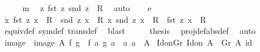 \begin{isabellebody}
\ {\isacharminus}{\kern0pt}\isanewline
\ \ \isamarkupfalse%
\ m\ \isamarkupfalse%
\ z{\isacharcolon}{\kern0pt}\ {\isachardoublequoteopen}{\isacharparenleft}{\kern0pt}fst\ z{\isacharcomma}{\kern0pt}\ snd\ z{\isacharparenright}{\kern0pt}\ {\isasymin}\ R{\isachardoublequoteclose}\ \isamarkupfalse%
\ auto\isanewline
\ \ \isamarkupfalse%
\ e\ \isamarkupfalse%
\ {\isachardoublequoteopen}{\isasymAnd}x{\isachardot}{\kern0pt}\ {\isacharparenleft}{\kern0pt}fst\ z{\isacharcomma}{\kern0pt}\ x{\isacharparenright}{\kern0pt}\ {\isasymin}\ R\ {\isasymLongrightarrow}\ {\isacharparenleft}{\kern0pt}snd\ z{\isacharcomma}{\kern0pt}\ x{\isacharparenright}{\kern0pt}\ {\isasymin}\ R{\isachardoublequoteclose}\ {\isachardoublequoteopen}{\isasymAnd}x{\isachardot}{\kern0pt}\ {\isacharparenleft}{\kern0pt}snd\ z{\isacharcomma}{\kern0pt}\ x{\isacharparenright}{\kern0pt}\ {\isasymin}\ R\ {\isasymLongrightarrow}\ {\isacharparenleft}{\kern0pt}fst\ z{\isacharcomma}{\kern0pt}\ x{\isacharparenright}{\kern0pt}\ {\isasymin}\ R{\isachardoublequoteclose}\isanewline
\ \ \ \ \isamarkupfalse%
\ equiv{\isacharunderscore}{\kern0pt}def\ sym{\isacharunderscore}{\kern0pt}def\ trans{\isacharunderscore}{\kern0pt}def\ \isamarkupfalse%
\ blast{\isacharplus}{\kern0pt}\isanewline
\ \ \isamarkupfalse%
\ \isamarkupfalse%
\ {\isacharquery}{\kern0pt}thesis\ \isamarkupfalse%
\ proj{\isacharunderscore}{\kern0pt}def{\isacharbrackleft}{\kern0pt}abs{\isacharunderscore}{\kern0pt}def{\isacharbrackright}{\kern0pt}\ \isamarkupfalse%
\ auto\isanewline
{}\isamarkupfalse%
%
\endisatagproof
{\isafoldproof}%
%
\isadelimproof
\isanewline
%
\endisadelimproof
\isanewline
\isanewline
{}\isamarkupfalse%
\ image{}\ \ {\isachardoublequoteopen}image{}\ A\ f\ g\ {\isacharequal}{\kern0pt}\ {\isacharbraceleft}{\kern0pt}{\isacharparenleft}{\kern0pt}f\ a{\isacharcomma}{\kern0pt}\ g\ a{\isacharparenright}{\kern0pt}\ {\isacharbar}{\kern0pt}\ a{\isachardot}{\kern0pt}\ a\ {\isasymin}\ A{\isacharbraceright}{\kern0pt}{\isachardoublequoteclose}\isanewline
\isanewline
{}\isamarkupfalse%
\ Id{\isacharunderscore}{\kern0pt}on{\isacharunderscore}{\kern0pt}Gr{\isacharcolon}{\kern0pt}\ {\isachardoublequoteopen}Id{\isacharunderscore}{\kern0pt}on\ A\ {\isacharequal}{\kern0pt}\ Gr\ A\ id{\isachardoublequoteclose}\isanewline
%
\isadelimproof
\ \ %
\endisadelimproof
%
\isatagproof

\end{isabellebody}
